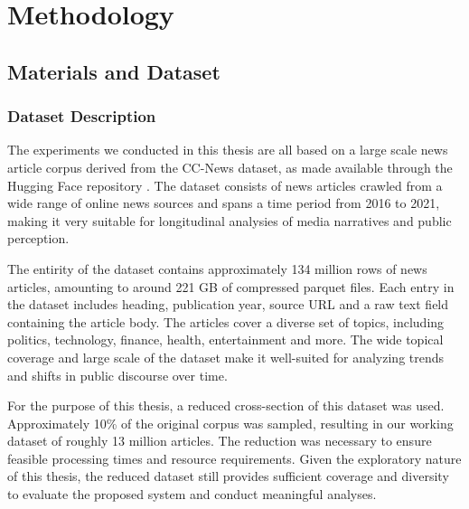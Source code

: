 


\chapter{Methodology} %

\label{ChapterMethodology} %


\section{Materials and Dataset}

\subsection{Dataset Description}

The experiments we conducted in this thesis are all based on a large scale news article corpus derived from the CC-News dataset, as made available through the Hugging Face repository \cite{ccnews}. The dataset consists of news articles crawled from a wide range of online news sources and spans a time period from 2016 to 2021, making it very suitable for longitudinal analysies of media narratives and public perception.

The entirity of the dataset contains approximately 134 million rows of news articles, amounting to around 221 GB of compressed parquet files. Each entry in the dataset includes heading, publication year, source URL and a raw text field containing the article body. The articles cover a diverse set of topics, including politics, technology, finance, health, entertainment and more. The wide topical coverage and large scale of the dataset make it well-suited for analyzing trends and shifts in public discourse over time.

For the purpose of this thesis, a reduced cross-section of this dataset was used. Approximately 10\% of the original corpus was sampled, resulting in our working dataset of roughly 13 million articles. The reduction was necessary to ensure feasible processing times and resource requirements. Given the exploratory nature of this thesis, the reduced dataset still provides sufficient coverage and diversity to evaluate the proposed system and conduct meaningful analyses.

